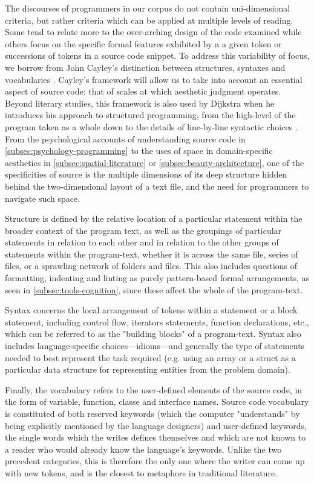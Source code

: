 The discourses of programmers in our corpus do not contain uni-dimensional criteria, but rather criteria which can be applied at multiple levels of reading. Some tend to relate more to the over-arching design of the code examined while others focus on the specific formal features exhibited by a a given token or successions of tokens in a source code snippet. To address this variability of focus, we borrow from John Cayley's distinction between structures, syntaxes and vocabularies \citep{cayley_code_2012}.  Cayley's framework will allow us to take into account an essential aspect of source code: that of scales at which aesthetic judgment operates. Beyond literary studies, this framework is also used by Dijkstra when he introduces his approach to structured programming, from the high-level of the program taken as a whole down to the details of line-by-line syntactic choices \citep{dijkstra_humble_2007}. From the psychological accounts of understanding source code in \autoref{subsec:psychology-programming} to the uses of space in domain-specific aesthetics in \autoref{subsec:spatial-literature} or \autoref{subsec:beauty-architecture}, one of the specificities of source is the multiple dimensions of its deep structure hidden behind the two-dimensional layout of a text file, and the need for programmers to navigate such space.

Structure is defined by the relative location of a particular statement within the broader context of the program text, as well as the groupings of particular statements in relation to each other and in relation to the other groups of statements within the program-text, whether it is across the same file, series of files, or a sprawling network of folders and files. This also includes questions of formatting, indenting and linting as purely pattern-based formal arrangements, as seen in \autoref{subsec:tools-cognition}, since these affect the whole of the program-text.

Syntax concerns the local arrangement of tokens within a statement or a block statement, including control flow, iterators statements, function declarations, etc., which can be referred to as the "building blocks" of a program-text. Syntax also includes language-specific choices—idioms—and generally the type of statements needed to best represent the task required (e.g. using an array or a struct as a particular data structure for representing entities from the problem domain).

Finally, the vocabulary refers to the user-defined elements of the source code, in the form of variable, function, classe and interface names. Source code vocabulary is constituted of both reserved keywords (which the computer "understands" by being explicitly mentioned by the language designers) and user-defined keywords, the single words which the writes defines themselves and which are not known to a reader who would already know the language's keywords. Unlike the two precedent categories, this is therefore the only one where the writer can come up with new tokens, and is the closest to metaphors in traditional literature.

